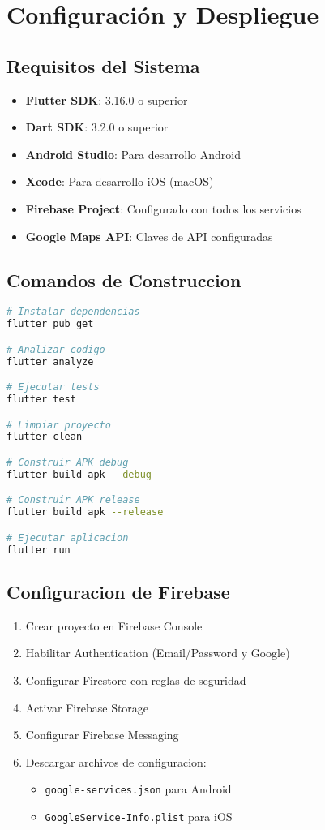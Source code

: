 \documentclass[12pt,a4paper]{article}
\begin{document}
\section{Configuración y Despliegue}

\subsection{Requisitos del Sistema}
\begin{itemize}[itemsep=0.5em]
    \item \textbf{Flutter SDK}: 3.16.0 o superior
    \item \textbf{Dart SDK}: 3.2.0 o superior
    \item \textbf{Android Studio}: Para desarrollo Android
    \item \textbf{Xcode}: Para desarrollo iOS (macOS)
    \item \textbf{Firebase Project}: Configurado con todos los servicios
    \item \textbf{Google Maps API}: Claves de API configuradas
\end{itemize}

\subsection{Comandos de Construccion}
\begin{lstlisting}[language=bash, caption=Comandos principales]
# Instalar dependencias
flutter pub get

# Analizar codigo
flutter analyze

# Ejecutar tests
flutter test

# Limpiar proyecto
flutter clean

# Construir APK debug
flutter build apk --debug

# Construir APK release
flutter build apk --release

# Ejecutar aplicacion
flutter run
\end{lstlisting}

\subsection{Configuracion de Firebase}
\begin{enumerate}[label=\arabic*.]
    \item Crear proyecto en Firebase Console
    \item Habilitar Authentication (Email/Password y Google)
    \item Configurar Firestore con reglas de seguridad
    \item Activar Firebase Storage
    \item Configurar Firebase Messaging
    \item Descargar archivos de configuracion:
    \begin{itemize}
        \item \texttt{google-services.json} para Android
        \item \texttt{GoogleService-Info.plist} para iOS
    \end{itemize}
\end{enumerate}
\end{document}
